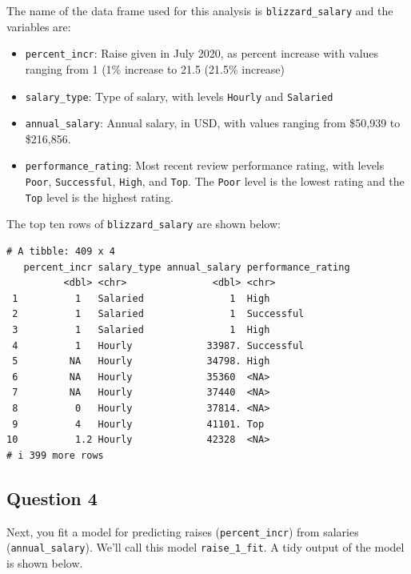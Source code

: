 \documentclass[
  letterpaper,
  DIV=11,
  numbers=noendperiod]{scrartcl}
\begin{document}
The name of the data frame used for this analysis is
\texttt{blizzard\_salary} and the variables are:

\begin{itemize}
\item
  \texttt{percent\_incr}: Raise given in July 2020, as percent increase
  with values ranging from 1 (1\% increase to 21.5 (21.5\% increase)
\item
  \texttt{salary\_type}: Type of salary, with levels \texttt{Hourly} and
  \texttt{Salaried}
\item
  \texttt{annual\_salary}: Annual salary, in USD, with values ranging
  from \$50,939 to \$216,856.
\item
  \texttt{performance\_rating}: Most recent review performance rating,
  with levels \texttt{Poor}, \texttt{Successful}, \texttt{High}, and
  \texttt{Top}. The \texttt{Poor} level is the lowest rating and the
  \texttt{Top} level is the highest rating.
\end{itemize}

The top ten rows of \texttt{blizzard\_salary} are shown below:

\begin{verbatim}
# A tibble: 409 x 4
   percent_incr salary_type annual_salary performance_rating
          <dbl> <chr>               <dbl> <chr>             
 1          1   Salaried               1  High              
 2          1   Salaried               1  Successful        
 3          1   Salaried               1  High              
 4          1   Hourly             33987. Successful        
 5         NA   Hourly             34798. High              
 6         NA   Hourly             35360  <NA>              
 7         NA   Hourly             37440  <NA>              
 8          0   Hourly             37814. <NA>              
 9          4   Hourly             41101. Top               
10          1.2 Hourly             42328  <NA>              
# i 399 more rows
\end{verbatim}

\hypertarget{question-4}{%
\subsection{Question 4}\label{question-4}}

Next, you fit a model for predicting raises (\texttt{percent\_incr})
from salaries (\texttt{annual\_salary}). We'll call this model
\texttt{raise\_1\_fit}. A tidy output of the model is shown below.
\end{document}
